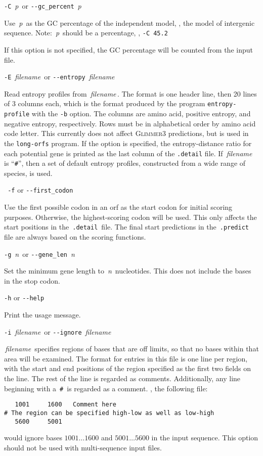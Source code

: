 \documentclass[fleqn,titlepage,11pt]{article}
\def\Desc#1{\,\mbox{\emph{#1}}\,}
\def\Gthree{\textsc{Glimmer3}}
\def\Pg#1{\texttt{#1}}
\begin{document}
\exdent
  \verb`-C` \Desc{p} \enskip or \enskip \verb`--gc_percent` \Desc{p}

  Use \Desc{p} as the GC percentage of the independent model, \ie,
  the model of intergenic sequence.
  Note:  \Desc{p} should be a percentage, \eg, \verb`-C 45.2`

  If this option is not specified, the GC percentage will be
  counted from the input file.

\exdent
  \verb`-E` \Desc{filename} \enskip or \enskip \verb`--entropy` \Desc{filename}

  Read entropy profiles from \Desc{filename}.  The format is one header
  line, then 20 lines of 3 columns each, which is the format produced
  by the program \Pg{entropy-profile} with the \Pg{-b} option.
  The columns are amino acid,
  positive entropy, and negative entropy, respectively.  Rows must be in
  alphabetical order by amino acid code letter.  This currently does
  not affect \Gthree{} predictions, but is used in
  the \Pg{long-orfs} program.  If the option is specified, the
  entropy-distance ratio for each potential gene is printed as the last column
  of the \Pg{.detail} file.  If \Desc{filename} is ``\Pg{\#}'', then
  a set of default entropy profiles, constructed from a wide range of
  species, is used.

\exdent
 \verb` -f` \enskip or \enskip \verb`--first_codon`

  Use the first possible codon in an orf as the start codon
  for initial scoring purposes.  Otherwise, the highest-scoring
  codon will be used.  This only affects the start positions in
  the \,\verb`.detail`\, file.  The final start predictions in
  the \,\verb`.predict`\, file are always based on the scoring
  functions.

\exdent
  \verb`-g` \Desc{n} \enskip or \enskip \verb`--gene_len` \Desc{n}

  Set the minimum gene length to \Desc{n} nucleotides.  This does not include
  the bases in the stop codon.

\exdent
  \verb`-h` \enskip or \enskip \verb`--help`

  Print the usage message.

\exdent
  \verb`-i` \Desc{filename} \enskip or \enskip \verb`--ignore` \Desc{filename}

  \Desc{filename} specifies regions of bases that are off 
  limits, so that no bases within that area will be examined.
  The format for entries in this file is one line per region,
  with the start and end positions of the region specified
  as the first two fields on the line.  The rest of the line
  is regarded as comments.  Additionally, any line beginning
  with a \,\verb`#`\, is regarded as a comment.  \Eg, the
  following file:
\BSV
\begin{verbatim}
   1001     1600   Comment here
# The region can be specified high-low as well as low-high
   5600     5001
\end{verbatim}
\ESV
  would ignore bases $1001 \ldots 1600$ and $5001 \ldots 5600$
  in the input sequence.  This option should not be used with
  multi-sequence input files.
\end{document}
